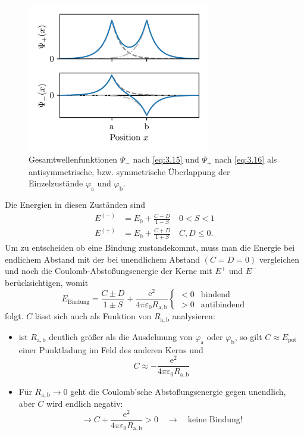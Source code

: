     \begin{figure}[H]
        \centering
        \includegraphics[width=8cm]{figures/vl04/wavefn_Psi_plus_minus.png}
        \caption{Gesamtwellenfunktionen $\Psi_-$ nach \eqref{eq:3.15} und $\Psi_+$ nach \eqref{eq:3.16} als antisymmetrische, bzw. symmetrische Überlappung der Einzelzustände $\varphi_\mathrm a$ und $\varphi_\mathrm b$.}
        \label{fig:I.3_wavefn_Psi_plus_minus}
    \end{figure}

    Die Energien in diesen Zuständen sind
    \begin{align}
        \label{eq:3.17}
        E^{(-)} &= E_{0} + \frac{C-D}{1-S} \quad 0 < S < 1 \\
        \label{eq:3.18}
        E^{(+)} &= E_0 + \frac{C+D}{1+S}\quad C, D \le 0.
    \end{align}
    Um zu entscheiden ob eine Bindung zustandekommt, muss man die Energie bei endlichem Abstand mit der bei unendlichem Abstand $\left( C= D = 0 \right) $ vergleichen und noch die Coulomb-Abstoßungsenergie der Kerne mit $ E^{+}$ und $E^{-}$ berücksichtigen, womit 
    $$
    E_{\text{Bindung}} = \frac{C \pm D}{1 \pm S} + \frac{\mathrm{e}^2}{4 \pi \varepsilon_0 R_\mathrm{a,b}}
    \begin{cases}
        < 0 &\text{bindend}\\
        > 0 &\text{antibindend}
    \end{cases}
    $$ 
    folgt. $C$ lässt sich auch als Funktion von $R_\mathrm{a,b}$ analysieren:
    \begin{itemize}
        \item ist $R_\mathrm{a,b}$ deutlich größer als die Ausdehnung von $ \varphi_\mathrm{a}$ oder $ \varphi_\mathrm{b}$, so gilt $C \approx E_{\text{pot}}$ einer Punktladung im Feld des anderen Kerns und
            $$
            C \approx - \frac{\mathrm{e}^2}{4 \pi \varepsilon_0 R_\mathrm{a,b}}
            $$
        \item Für $R_\mathrm{a,b}\to 0$ geht die Coulomb'sche Abstoßungsenergie gegen unendlich, aber $C$ wird endlich negativ:
            $$
            \to C + \frac{\mathrm{e}^2}{4\pi \varepsilon_0 R_\mathrm{a,b}}>0 \quad \to \quad \text{keine Bindung!}
            $$ 
    \end{itemize}


